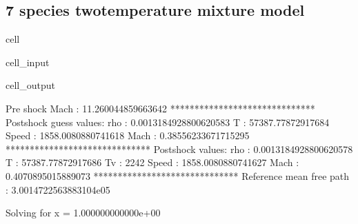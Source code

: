 \documentclass[letterpaper,10pt,english]{jupyterBook}
\begin{document}
\subsection{7 species two\sphinxhyphen{}temperature mixture model}
\label{\detokenize{Results/Results:id6}}
\begin{sphinxuseclass}{cell}\begin{sphinxVerbatimInput}

\begin{sphinxuseclass}{cell_input}
\begin{sphinxVerbatim}[commandchars=\\\{\}]
  
      
    
       

\end{sphinxVerbatim}

\end{sphinxuseclass}\end{sphinxVerbatimInput}
\begin{sphinxVerbatimOutput}

\begin{sphinxuseclass}{cell_output}
\begin{sphinxVerbatim}[commandchars=\\\{\}]
Pre shock Mach : 11.260044859663642
******************************
Post\PYGZhy{}shock guess values:
rho    : 0.0013184928800620583
T      : 57387.77872917684
Speed  : 1858.0080880741618
Mach   : 0.38556233671715295
******************************
Post\PYGZhy{}shock values:
rho    : 0.0013184928800620578
T      : 57387.77872917686
Tv     : 2242
Speed  : 1858.0080880741627
Mach   : 0.4070895015889073
******************************
Reference mean free path : 3.0014722563883104e\PYGZhy{}05

Solving for x = 1.000000000000e+00
\end{sphinxVerbatim}

\end{sphinxuseclass}\end{sphinxVerbatimOutput}

\end{sphinxuseclass}
\end{document}
